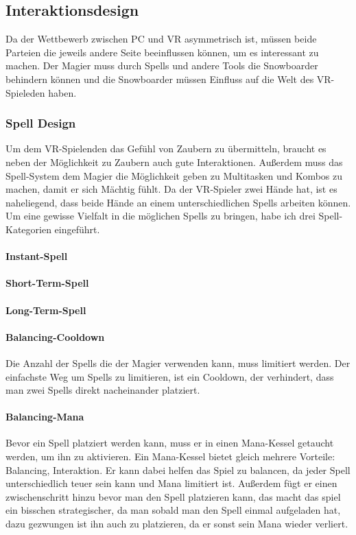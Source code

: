 \subsection{Interaktionsdesign}

Da der Wettbewerb zwischen PC und VR asymmetrisch ist, müssen beide Parteien die jeweils andere Seite beeinflussen können, um es interessant zu machen. Der Magier muss durch Spells und andere Tools die Snowboarder behindern können und die Snowboarder müssen Einfluss auf die Welt des VR-Spieleden haben.

\subsubsection{Spell Design\label{_spell_design}}

Um dem VR-Spielenden das Gefühl von Zaubern zu übermitteln, braucht es neben der Möglichkeit zu Zaubern auch gute Interaktionen. Außerdem muss das Spell-System dem Magier die Möglichkeit geben zu Multitasken und Kombos zu machen, damit er sich Mächtig fühlt. Da der VR-Spieler zwei Hände hat, ist es naheliegend, dass beide Hände an einem unterschiedlichen Spells arbeiten können. Um eine gewisse Vielfalt in die möglichen Spells zu bringen, habe ich drei Spell-Kategorien eingeführt.

\paragraph{Instant-Spell}
\paragraph{Short-Term-Spell}
\paragraph{Long-Term-Spell}

\paragraph{Balancing-Cooldown}
Die Anzahl der Spells die der Magier verwenden kann, muss limitiert werden. Der einfachste Weg um Spells zu limitieren, ist ein Cooldown, der verhindert, dass man zwei Spells direkt nacheinander platziert.

\paragraph{Balancing-Mana}
Bevor ein Spell platziert werden kann, muss er in einen Mana-Kessel getaucht werden, um ihn zu aktivieren. Ein Mana-Kessel bietet gleich mehrere Vorteile: Balancing, Interaktion. Er kann dabei helfen das Spiel zu balancen, da jeder Spell unterschiedlich teuer sein kann und Mana limitiert ist. Außerdem fügt er einen zwischenschritt hinzu bevor man den Spell platzieren kann, das macht das spiel ein bisschen strategischer, da man sobald man den Spell einmal aufgeladen hat, dazu gezwungen ist ihn auch zu platzieren, da er sonst sein Mana wieder verliert. 

